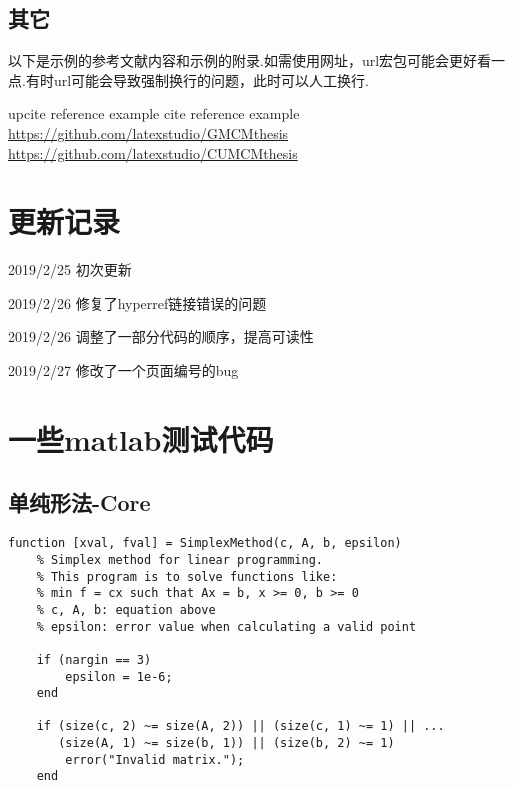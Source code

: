\documentclass[bwprint, withouttitlepage]{mathexpthesis}
\begin{document}
\subsection{其它}
以下是示例的参考文献内容和示例的附录.如需使用网址，url宏包可能会更好看一点.有时url可能会导致强制换行的问题，此时可以人工换行.

\begin{thebibliography}{99}
     upcite reference example
     cite reference example
     \url{https://github.com/latexstudio/GMCMthesis}
     \url{https://github.com/latexstudio/CUMCMthesis}
\end{thebibliography}

\begin{appendices}
\section{更新记录}
2019/2/25 初次更新

2019/2/26 修复了hyperref链接错误的问题

2019/2/26 调整了一部分代码的顺序，提高可读性

2019/2/27 修改了一个页面编号的bug

\section{一些matlab测试代码}
\subsection{单纯形法-Core}
\begin{verbatim}
function [xval, fval] = SimplexMethod(c, A, b, epsilon)
    % Simplex method for linear programming.
    % This program is to solve functions like:
    % min f = cx such that Ax = b, x >= 0, b >= 0
    % c, A, b: equation above
    % epsilon: error value when calculating a valid point
    
    if (nargin == 3)
        epsilon = 1e-6;
    end

    if (size(c, 2) ~= size(A, 2)) || (size(c, 1) ~= 1) || ...
       (size(A, 1) ~= size(b, 1)) || (size(b, 2) ~= 1)
        error("Invalid matrix.");
    end


\end{verbatim}
\end{appendices}
\end{document}
